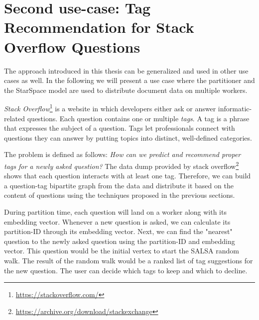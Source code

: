 \section{Second use-case: Tag Recommendation for Stack Overflow Questions}
\label{sec:second-usecase}
The approach introduced in this thesis can be generalized and used in other use cases as well. In the following we will present a use case where the partitioner and the StarSpace model are used to distribute document data on multiple workers.


\emph{Stack Overflow}\footnote{\url{https://stackoverflow.com/}} is a website in which developers either ask or answer informatic-related questions. Each question contains one or multiple \emph{tags}. A tag is a phrase that expresses the subject of a question. Tags let professionals connect with questions they can answer by putting topics into distinct, well-defined categories.


The problem is defined as follows: \emph{How can we predict and recommend proper tags for a newly asked question?} The data dump provided by stack overflow\footnote{\url{https://archive.org/download/stackexchange}} shows that each question interacts with at least one tag. Therefore, we can build a question-tag bipartite graph from the data and distribute it based on the content of questions using the techniques proposed in the previous sections.


During partition time, each question will land on a worker along with its embedding vector. Whenever a new question is asked, we can calculate its partition-ID through its embedding vector. Next, we can find the "nearest" question to the newly asked question using the partition-ID and embedding vector. This question would be the initial vertex to start the SALSA random walk. The result of the random walk would be a ranked list of tag suggestions for the new question. The user can decide which tags to keep and which to decline.
